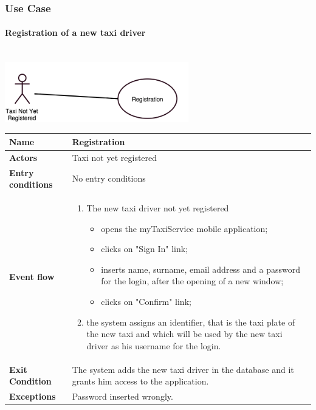 \subsubsection{Use Case}
			\paragraph{Registration of a new taxi driver}
			\begin{center}
			~\\
			\includegraphics[width=0.60\textwidth]{./images/UseCaseTaxiNotYetRegistered.png}~
			\end{center}
			\begin{tabular}{l l}
		 \textbf {Name} & Registration  \\ \hline
		 \textbf{Actors} & Taxi not yet registered \\ \hline
		 \textbf{Entry conditions} & No entry conditions \\ \hline
		 \textbf{Event flow} & 
		 \parbox{0.7\textwidth}{
		 \begin{enumerate}
		 \item The new taxi driver not yet registered
		    \begin{itemize}
		    \item opens the myTaxiService mobile application;
		    \item clicks on "Sign In" link;
		    \item inserts name, surname, email address and a password for the login, after the opening of a new window;
		    \item clicks on "Confirm" link;
		    \end{itemize}
		 \item the system assigns an identifier, that is the taxi plate of the new taxi and which will be used by the new taxi driver as his username for the login.
		 \end{enumerate}
		 } \\ \hline
		 \textbf{Exit Condition} &  \parbox{0.7\textwidth}{The system adds the new taxi driver in the database and it grants him access to the application.} \\ \hline
		 \textbf{Exceptions} & Password inserted wrongly.
		\end{tabular}
		
